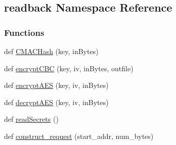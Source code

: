 \hypertarget{namespacereadback}{}\subsection{readback Namespace Reference}
\label{namespacereadback}
\subsubsection*{Functions}
\begin{DoxyCompactItemize}
\item 
def \hyperlink{namespacereadback_a4060e3a940d166a7303d3327c2d6d2c7}{C\+M\+A\+C\+Hash} (key, in\+Bytes)
\item 
def \hyperlink{namespacereadback_a5a22755f0dd142ba5bf578139f319a0e}{encrypt\+C\+BC} (key, iv, in\+Bytes, outfile)
\item 
def \hyperlink{namespacereadback_a31d9a10134fc94e40ec6db79938a0b38}{encrypt\+A\+ES} (key, iv, in\+Bytes)
\item 
def \hyperlink{namespacereadback_a91dbf6b6233274d0eff416f3e56f0edf}{decrypt\+A\+ES} (key, iv, in\+Bytes)
\item 
def \hyperlink{namespacereadback_a7e694d4aa4ee2fc3c68862d4c30379e5}{read\+Secrets} ()
\item 
def \hyperlink{namespacereadback_ac98f954f8259c56156baf91af488f6cf}{construct\+\_\+request} (start\+\_\+addr, num\+\_\+bytes)
\end{DoxyCompactItemize}
